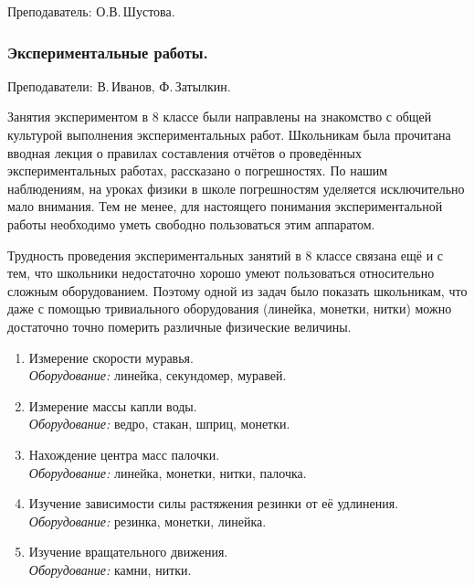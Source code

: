 \documentclass[12pt,a4paper,oneside,draft]{scrartcl}
\newcounter{notask}
\newlength{\h}
\newlength{\x}
\begin{document}
\textsf{Преподаватель: О.В.\,Шустова.}
\smallskip
\parindent=0mm






\setcounter{notask}{1}
\parindent=5mm

\subsubsection{Экспериментальные работы.}
\label{sec:daily_8_exp}

\textsf{Преподаватели: В.\,Иванов, Ф.\,Затылкин.}

Занятия экспериментом в 8 классе были направлены на знакомство с общей
культурой выполнения экспериментальных работ. Школьникам была
прочитана вводная лекция о правилах составления отчётов о проведённых
экспериментальных работах, рассказано о погрешностях. По нашим
наблюдениям, на уроках физики в школе погрешностям уделяется
исключительно мало внимания. Тем не менее, для настоящего понимания
экспериментальной работы необходимо уметь свободно пользоваться этим
аппаратом.

Трудность проведения экспериментальных занятий в 8 классе связана ещё
и с тем, что школьники недостаточно хорошо умеют пользоваться
относительно сложным оборудованием. Поэтому одной из задач было
показать школьникам, что даже с помощью тривиального оборудования
(линейка, монетки, нитки) можно достаточно точно померить различные
физические величины. 

\begin{enumerate}
\item Измерение скорости муравья.  \\ \textit{Оборудование:} линейка,
  секундомер, муравей.
\item Измерение массы капли воды. \\ \textit{Оборудование:} ведро,
  стакан, шприц, монетки.
\item Нахождение центра масс палочки. \\ \textit{Оборудование:}
  линейка, монетки, нитки, палочка.
\item Изучение зависимости силы растяжения резинки от её удлинения. \\
  \textit{Оборудование:} резинка, монетки, линейка.
\item Изучение вращательного движения. \\ \textit{Оборудование:}
  камни, нитки. 
\end{enumerate}
\end{document}
